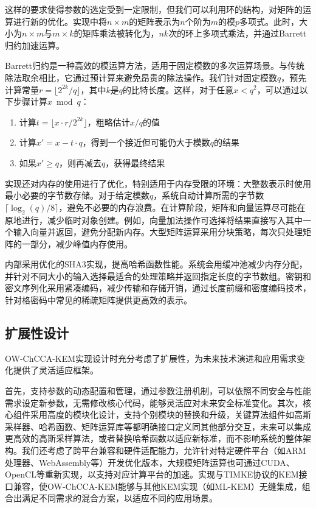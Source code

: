 这样的要求使得参数的选定受到一定限制，但我们可以利用环的结构，对矩阵的运算进行新的优化。实现中将$n \times m$的矩阵表示为$n$个阶为$m$的模$p$多项式。此时，大小为$n\times m$与$m \times k$的矩阵乘法被转化为，$nk$次的环上多项式乘法，并通过Barrett归约加速运算\cite{r_omondi_modular_2020}。

Barrett归约是一种高效的模运算方法，适用于固定模数的多次运算场景。与传统除法取余相比，它通过预计算来避免昂贵的除法操作。我们针对固定模数$q$，预先计算常量$r = \lfloor 2^{2k}/q \rfloor$，其中$k$是$q$的比特长度。这样，对于任意$x < q^2$，可以通过以下步骤计算$x \bmod q$：
\begin{enumerate}
    \item 计算$t = \lfloor x \cdot r / 2^{2k} \rfloor$，粗略估计$x/q$的值
    \item 计算$x' = x - t \cdot q$，得到一个接近但可能仍大于模数$q$的结果
    \item 如果$x' \geq q$，则再减去$q$，获得最终结果
\end{enumerate}

实现还对内存的使用进行了优化，特别适用于内存受限的环境：大整数表示时使用最小必要的字节数存储。对于给定模数$q$，系统自动计算所需的字节数$\lceil\log_2(q)/8\rceil$，避免不必要的内存浪费。在计算阶段，矩阵和向量运算尽可能在原地进行，减少临时对象创建。例如，向量加法操作可选择将结果直接写入其中一个输入向量并返回，避免分配新内存。大型矩阵运算采用分块策略，每次只处理矩阵的一部分，减少峰值内存使用。

内部采用优化的SHA3实现，提高哈希函数性能。系统会用缓冲池减少内存分配，并针对不同大小的输入选择最适合的处理策略并返回指定长度的字节数组。密钥和密文序列化采用紧凑编码，减少传输和存储开销，通过长度前缀和密度编码技术，针对格密码中常见的稀疏矩阵提供更高效的表示。

\subsection{扩展性设计}

OW-ChCCA-KEM实现设计时充分考虑了扩展性，为未来技术演进和应用需求变化提供了灵活适应框架。

首先，支持参数的动态配置和管理，通过参数注册机制，可以依照不同安全与性能需求设定新参数，无需修改核心代码，能够灵活应对未来安全标准变化。其次，核心组件采用高度的模块化设计，支持个别模块的替换和升级，关键算法组件如高斯采样器、哈希函数、矩阵运算库等都明确接口定义同其他部分交互，未来可以集成更高效的高斯采样算法，或者替换哈希函数以适应新标准，而不影响系统的整体架构。我们还考虑了跨平台兼容和硬件适配能力，允许针对特定硬件平台（如ARM处理器、WebAssembly等）开发优化版本，大规模矩阵运算也可通过CUDA、OpenCL等重新实现，以支持对应计算平台的加速。实现与TIMKE协议的KEM接口兼容，使OW-ChCCA-KEM能够与其他KEM实现（如ML-KEM）无缝集成，组合出满足不同需求的混合方案，以适应不同的应用场景。

